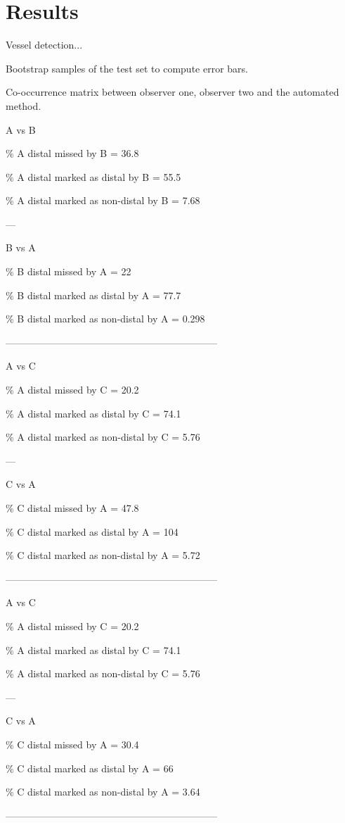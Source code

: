 \documentclass[runningheads,a4paper]{llncs}
\begin{document}
\section{Results}
\label{s:results}
Vessel detection...

Bootstrap samples of the test set to compute error bars.

Co-occurrence matrix between observer one, observer two and the automated method.

A vs B

\% A distal missed by B = 36.8

\% A distal marked as distal by B = 55.5

\% A distal marked as non-distal by B = 7.68

---

B vs A

\% B distal missed by A = 22

\% B distal marked as distal by A = 77.7

\% B distal marked as non-distal by A = 0.298

-----------------------------------------------------------------

A vs C

\% A distal missed by C = 20.2

\% A distal marked as distal by C = 74.1

\% A distal marked as non-distal by C = 5.76

---

C vs A

\% C distal missed by A = 47.8

\% C distal marked as distal by A = 104

\% C distal marked as non-distal by A = 5.72

-----------------------------------------------------------------

A vs C

\% A distal missed by C = 20.2

\% A distal marked as distal by C = 74.1

\% A distal marked as non-distal by C = 5.76

---

C vs A

\% C distal missed by A = 30.4

\% C distal marked as distal by A = 66

\% C distal marked as non-distal by A = 3.64

-----------------------------------------------------------------
\end{document}
